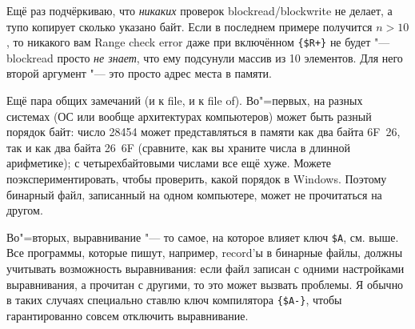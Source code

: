 Ещё раз подчёркиваю, что \textit{никаких} проверок blockread/blockwrite не делает, а тупо копирует 
сколько указано байт. Если в последнем примере получится $n>10$, то никакого вам Range check error 
даже при включённом \verb'{$R+}' не будет "--- blockread просто \textit{не знает}, что ему 
подсунули массив из 10 элементов. Для него второй аргумент "--- это просто адрес места в 
памяти.

Ещё пара общих замечаний (и к file, и к file of). Во"=первых, на разных системах (ОС или вообще 
архитектурах компьютеров) может быть разный порядок байт: число 28454 
может представляться в памяти как два байта 6F~26, так и как два байта 26~6F (сравните, как вы 
храните числа в длинной арифметике); с четырехбайтовыми числами все ещё хуже. 
Можете поэкспериментировать, чтобы проверить, какой порядок в 
Windows. Поэтому бинарный файл, записанный на одном компьютере, может не прочитаться на другом.

Во"=вторых, выравнивание "--- то самое, на которое влияет ключ \verb|$A|, см. выше. Все программы, которые пишут, например, record'ы в 
бинарные файлы, должны учитывать возможность выравнивания: если файл записан с одними настройками выравнивания, а 
прочитан с другими, то это может вызвать проблемы. Я обычно в таких случаях специально ставлю ключ 
компилятора \verb'{$A-}', чтобы гарантированно совсем отключить выравнивание.

